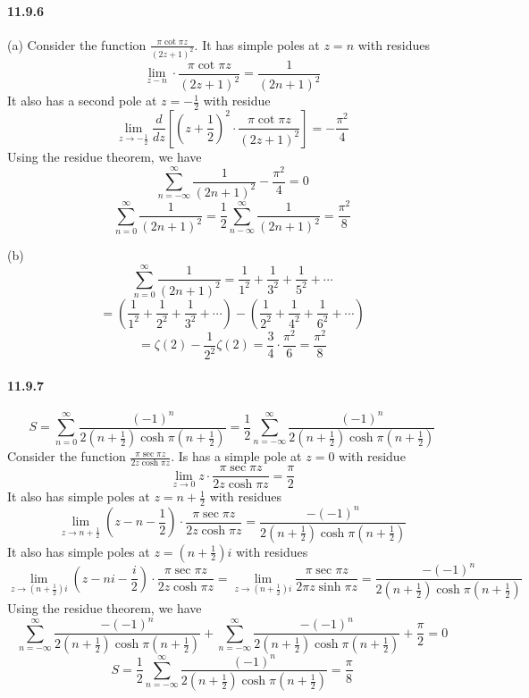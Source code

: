 \documentclass[a4paper]{article}
\begin{document}
\paragraph{11.9.6}
(a) Consider the function $\frac{\pi\cot\pi z}{(2z+1)^2}$. It has simple poles at $z=n$ with residues
\[
\lim_{z-n}\cdot\frac{\pi\cot\pi z}{(2z+1)^2}=\frac{1}{(2n+1)^2}
\]
It also has a second pole at $z=-\frac{1}{2}$ with residue
\[
\lim_{z\to-\frac{1}{2}}\frac{d}{dz}\left[(z+\frac{1}{2})^2\cdot\frac{\pi\cot\pi z}{(2z+1)^2} \right]=-\frac{\pi^2}{4}
\]
Using the residue theorem, we have
\[
\sum_{n=-\infty}^\infty\frac{1}{(2n+1)^2}-\frac{\pi^2}{4}=0
\]
\[
\sum_{n=0}^\infty\frac{1}{(2n+1)^2}=\frac{1}{2}\sum_{n-\infty}^\infty\frac{1}{(2n+1)^2}=\frac{\pi^2}{8}
\]

(b)
\[
\sum_{n=0}^\infty\frac{1}{(2n+1)^2}=\frac{1}{1^2}+\frac{1}{3^2}+\frac{1}{5^2}+\cdots
\]
\[
=(\frac{1}{1^2}+\frac{1}{2^2}+\frac{1}{3^2}+\cdots)-(\frac{1}{2^2}+\frac{1}{4^2}+\frac{1}{6^2}+\cdots)
\]
\[
=\zeta(2)-\frac{1}{2^2}\zeta(2)=\frac{3}{4}\cdot\frac{\pi^2}{6}=\frac{\pi^2}{8}
\]

\paragraph{11.9.7}
\[
S=\sum_{n=0}^\infty\frac{(-1)^n}{2(n+\frac{1}{2})\cosh\pi(n+\frac{1}{2})}=\frac{1}{2}\sum_{n=-\infty}^\infty\frac{(-1)^n}{2(n+\frac{1}{2})\cosh\pi(n+\frac{1}{2})}
\]
Consider the function $\frac{\pi\sec\pi z}{2z\cosh\pi z}$. Is has a simple pole at $z=0$ with residue
\[
\lim_{z\to0}z\cdot\frac{\pi\sec\pi z}{2z\cosh\pi z}=\frac{\pi}{2}
\]
It also has simple poles at $z=n+\frac{1}{2}$ with residues 
\[
\lim_{z\to n+\frac{1}{2}}(z-n-\frac{1}{2})\cdot\frac{\pi\sec\pi z}{2z\cosh\pi z}=\frac{-(-1)^n}{2(n+\frac{1}{2})\cosh\pi(n+\frac{1}{2})}
\]
It also has simple poles at $z=(n+\frac{1}{2})i$ with residues 
\[
\lim_{z\to(n+\frac{1}{2})i}(z-ni-\frac{i}{2})\cdot\frac{\pi\sec\pi z}{2z\cosh\pi z}=\lim_{z\to(n+\frac{1}{2})i}\frac{\pi\sec\pi z}{2\pi z\sinh\pi z}=\frac{-(-1)^n}{2(n+\frac{1}{2})\cosh\pi(n+\frac{1}{2})}
\]
Using the residue theorem, we have
\[
\sum_{n=-\infty}^\infty\frac{-(-1)^n}{2(n+\frac{1}{2})\cosh\pi(n+\frac{1}{2})}+\sum_{n=-\infty}^\infty\frac{-(-1)^n}{2(n+\frac{1}{2})\cosh\pi(n+\frac{1}{2})}+\frac{\pi}{2}=0
\]
\[
S=\frac{1}{2}\sum_{n=-\infty}^\infty\frac{(-1)^n}{2(n+\frac{1}{2})\cosh\pi(n+\frac{1}{2})}=\frac{\pi}{8}
\]
\end{document}
